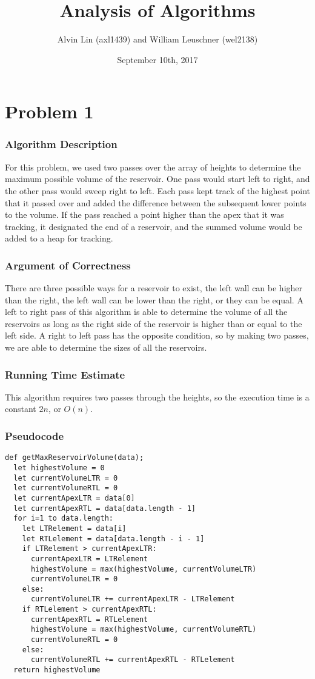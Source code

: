 \documentclass[letterpaper, 12pt]{math}
\title{Analysis of Algorithms}
\author{Alvin Lin (axl1439) and William Leuschner (wel2138)}
\date{September 10th, 2017}
\begin{document}
\maketitle

\section*{Problem 1}

\subsubsection*{Algorithm Description}
For this problem, we used two passes over the array of heights to determine
the maximum possible volume of the reservoir. One pass would start left to
right, and the other pass would sweep right to left. Each pass kept track of
the highest point that it passed over and added the difference between the
subsequent lower points to the volume. If the pass reached a point higher than
the apex that it was tracking, it designated the end of a reservoir, and the
summed volume would be added to a heap for tracking.

\subsubsection*{Argument of Correctness}
There are three possible ways for a reservoir to exist, the left wall can be
higher than the right, the left wall can be lower than the right, or they can
be equal. A left to right pass of this algorithm is able to determine the
volume of all the reservoirs as long as the right side of the reservoir is
higher than or equal to the left side. A right to left pass has the opposite
condition, so by making two passes, we are able to determine the sizes of all
the reservoirs.

\subsubsection*{Running Time Estimate}
This algorithm requires two passes through the heights, so the execution time is
a constant \( 2n \), or \( O(n) \).

\subsubsection*{Pseudocode}
\begin{lstlisting}
def getMaxReservoirVolume(data);
  let highestVolume = 0
  let currentVolumeLTR = 0
  let currentVolumeRTL = 0
  let currentApexLTR = data[0]
  let currentApexRTL = data[data.length - 1]
  for i=1 to data.length:
    let LTRelement = data[i]
    let RTLelement = data[data.length - i - 1]
    if LTRelement > currentApexLTR:
      currentApexLTR = LTRelement
      highestVolume = max(highestVolume, currentVolumeLTR)
      currentVolumeLTR = 0
    else:
      currentVolumeLTR += currentApexLTR - LTRelement
    if RTLelement > currentApexRTL:
      currentApexRTL = RTLelement
      highestVolume = max(highestVolume, currentVolumeRTL)
      currentVolumeRTL = 0
    else:
      currentVolumeRTL += currentApexRTL - RTLelement
  return highestVolume
\end{lstlisting}
\end{document}
